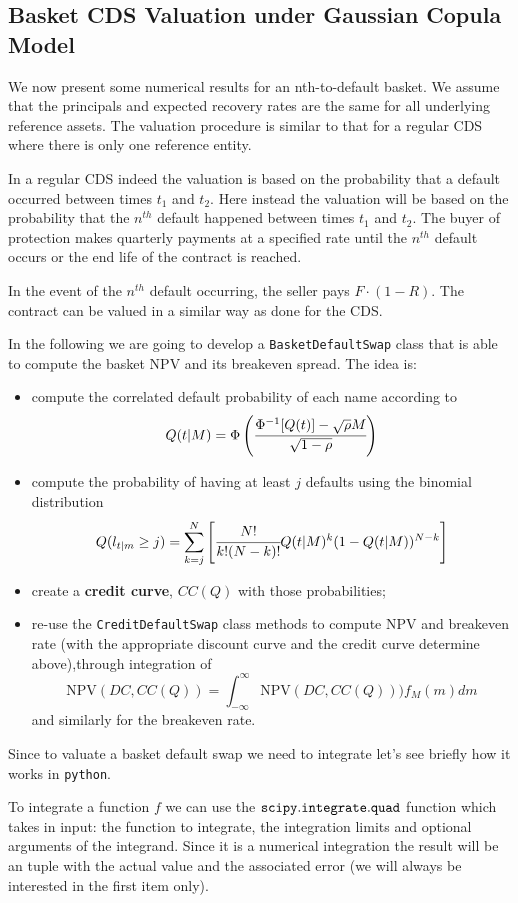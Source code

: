 \subsection{Basket CDS Valuation under Gaussian Copula Model}\label{basket-cds-valuation-under-market-standard-model}
We now present some numerical results for an nth-to-default basket.
We assume that the principals and expected recovery rates are the same
for all underlying reference assets. The valuation procedure is similar
to that for a regular CDS where there is only one reference entity.

In a regular CDS indeed the valuation is based on the probability that a
default occurred between times \(t_1\) and \(t_2\). Here instead the
valuation will be based on the probability that the $n^{th}$ default happened
between times \(t_1\) and \(t_2\).
The buyer of protection makes quarterly payments at a
specified rate until the $n^{th}$ default occurs or the end life
of the contract is reached.

In the event of the $n^{th}$ default occurring, the seller pays
\(F\cdot(1-R)\). The contract can be valued in a similar way as done for the CDS.

In the following we are going to develop a \texttt{BasketDefaultSwap} class that is able to compute the basket NPV and its breakeven spread.
The idea is:
\begin{itemize}
\item compute the correlated default probability of each name according to 
\[Q(t|M) = \Phi\left(\cfrac{\Phi^{-1}[Q(t)]-\sqrt{\rho} M}{\sqrt{1-\rho}}\right)\]
\item compute the probability of having at least $j$ defaults using the binomial distribution
\[Q(l_{t|m} \ge j) = \sum_{k=j}^{N}\left[  \cfrac{N!}{k!(N-k)!}Q(t|M)^k(1-Q(t|M))^{N-k}\right]\]
\item create a \textbf{credit curve}, $CC(Q)$ with those probabilities;
\item re-use the \texttt{CreditDefaultSwap} class methods to compute NPV and breakeven rate (with the appropriate discount curve and the credit curve determine above),through integration of
\[ \mathrm{NPV}(DC, CC(Q)) = \int_{-\infty}^{\infty}{\mathrm{NPV}(DC, CC(Q))) f_M(m)dm} \]
and similarly for the breakeven rate.
\end{itemize}

Since to valuate a basket default swap we need to integrate let's see briefly how it works in \texttt{python}.

To integrate a function \(f\) we can
use the \(\tt{scipy.integrate.quad}\) function which takes in input: the function to integrate, the integration limits and optional arguments of
the integrand. Since it is a numerical integration the result will be an tuple with the actual value and the associated error (we will always be interested in the first item only).

